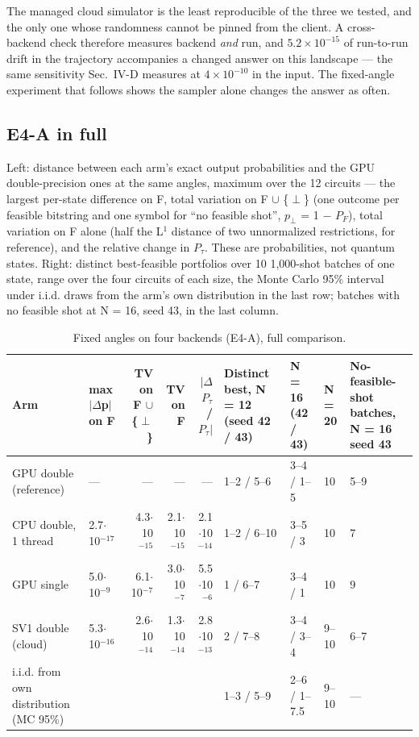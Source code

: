 \documentclass[journal]{IEEEtran}
\begin{document}
The managed cloud simulator is the least reproducible of the three we tested, and the only one whose randomness cannot be pinned from the client. A cross-backend check therefore measures backend \textit{and} run, and $5.2\times 10^{-15}$ of run-to-run drift in the trajectory accompanies a changed answer on this landscape --- the same sensitivity Sec.~IV-D measures at $4\times 10^{-10}$ in the input. The fixed-angle experiment that follows shows the sampler alone changes the answer as often.


\subsection{E4-A in full}


Left: distance between each arm's exact output probabilities and the GPU double-precision ones at the same angles, maximum over the 12 circuits --- the largest per-state difference on F, total variation on F $\cup$ \{$\perp$\} (one outcome per feasible bitstring and one symbol for ``no feasible shot'', $p_{\perp}$ = 1 $-$ $P_{F}$), total variation on F alone (half the L$^{1}$ distance of two unnormalized restrictions, for reference), and the relative change in $P_{\tau}$. These are probabilities, not quantum states. Right: distinct best-feasible portfolios over 10 1,000-shot batches of one state, range over the four circuits of each size, the Monte Carlo 95\% interval under i.i.d. draws from the arm's own distribution in the last row; batches with no feasible shot at N = 16, seed 43, in the last column.


\begin{table}[!t]
\centering
\scriptsize
\caption{Fixed angles on four backends (E4-A), full comparison.}
\label{tab:S30}
\begin{tabular}{p{}p{}rrrp{}p{}lp{}}
\toprule
Arm & max $|$$\Delta$p$|$ on F & TV on F $\cup$ \{$\perp$\} & TV on F & $|$$\Delta$$P_{\tau}$/$P_{\tau}$$|$ & Distinct best, N = 12 (seed 42 / 43) & N = 16 (42 / 43) & N = 20 & No-feasible-shot batches, N = 16 seed 43 \\
\midrule
GPU double (reference) & --- & --- & --- & --- & 1--2 / 5--6 & 3--4 / 1--5 & 10 & 5--9 \\
CPU double, 1 thread & 2.7$\cdot$10$^{-17}$ & 4.3$\cdot$10$^{-15}$ & 2.1$\cdot$10$^{-15}$ & 2.1$\cdot$10$^{-14}$ & 1--2 / 6--10 & 3--5 / 3 & 10 & 7 \\
GPU single & 5.0$\cdot$10$^{-9}$ & 6.1$\cdot$10$^{-7}$ & 3.0$\cdot$10$^{-7}$ & 5.5$\cdot$10$^{-6}$ & 1 / 6--7 & 3--4 / 1 & 10 & 9 \\
SV1 double (cloud) & 5.3$\cdot$10$^{-16}$ & 2.6$\cdot$10$^{-14}$ & 1.3$\cdot$10$^{-14}$ & 2.8$\cdot$10$^{-13}$ & 2 / 7--8 & 3--4 / 3--4 & 9--10 & 6--7 \\
i.i.d. from own distribution (MC 95\%) &  &  &  &  & 1--3 / 5--9 & 2--6 / 1--7.5 & 9--10 & --- \\
\bottomrule
\end{tabular}
\end{table}
\end{document}
